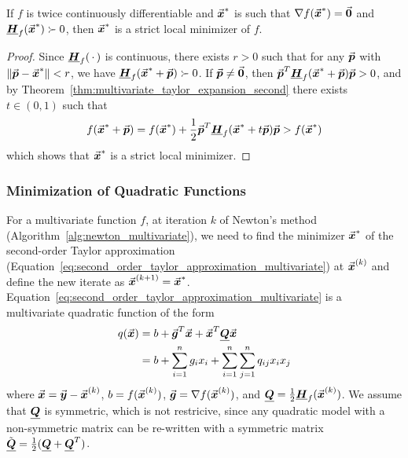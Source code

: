 \begin{theorem}\label{thm:sufficient_optimality_conditions_multivariate}
If \(f\) is twice continuously differentiable and \(\vec{\boldsymbol{x}}^{*}\) is such that \(\nabla f(\vec{\boldsymbol{x}}^{*})=\vec{\boldsymbol{0}}\) and \(\underline{\boldsymbol{H}}_{f}(\vec{\boldsymbol{x}}^{*})\succ 0\), then \(\vec{\boldsymbol{x}}^{*}\) is a strict local minimizer of \(f\).
\end{theorem}
\begin{proof}
Since \(\underline{\boldsymbol{H}}_{f}(\, \cdot \,)\) is continuous, there exists \(r>0\) such that for any \(\vec{\boldsymbol{p}}\) with \(\|\vec{\boldsymbol{p}} - \vec{\boldsymbol{x}}^{*}\| < r\), we have \(\underline{\boldsymbol{H}}_{f}(\vec{\boldsymbol{x}}^{*}+\vec{\boldsymbol{p}}) \succ 0\). 
If \(\vec{\boldsymbol{p}} \neq \vec{\boldsymbol{0}}\), then \(\vec{\boldsymbol{p}}^{T}\underline{\boldsymbol{H}}_{f}(\vec{\boldsymbol{x}}^{*}+\vec{\boldsymbol{p}})\vec{\boldsymbol{p}} > 0\), and by Theorem~\ref{thm:multivariate_taylor_expansion_second} there exists \(t \in (0,1)\) such that
\[
f(\vect{x}^{*}+\vect{p})=f(\vect{x}^{*})+\frac{1}{2}\vect{p}^{T}\matr{H}_{f}(\vect{x}^{*}+t\vect{p})\vect{p} > f(\vect{x}^{*}) %
\]
which shows that \(\vec{\boldsymbol{x}}^{*}\) is a strict local minimizer.
\end{proof}

\subsubsection{Minimization of Quadratic Functions}
\label{subsubsec:quadratic_minimization}
For a multivariate function \(f\), at iteration \(k\) of Newton's method (Algorithm~\ref{alg:newton_multivariate}), we need to find the minimizer \(\vec{\boldsymbol{x}}^{*}\) of the second-order Taylor approximation (Equation~\ref{eq:second_order_taylor_approximation_multivariate}) at \(\vec{\boldsymbol{x}}^{(k)}\) and define the new iterate as \(\vec{\boldsymbol{x}}^{(k+1)} = \vec{\boldsymbol{x}}^{*}\).
Equation~\ref{eq:second_order_taylor_approximation_multivariate} is a multivariate quadratic function of the form
\begin{align}
q(\vec{\boldsymbol{x}}) &= b + \vec{\boldsymbol{g}}^{T}\vec{\boldsymbol{x}} + \vec{\boldsymbol{x}}^{T}\underline{\boldsymbol{Q}}\vec{\boldsymbol{x}} \label{eq:multivariate_quadratic_function} \\
&= b + \sum_{i=1}^{n}g_{i}x_{i} + \sum_{i=1}^{n}\sum_{j=1}^{n}q_{ij}x_{i}x_{j} \label{eq:multivariate_quadratic_function_expanded}
\end{align}
where \(\vec{\boldsymbol{x}} = \vec{\boldsymbol{y}} - \vec{\boldsymbol{x}}^{(k)}\), \(b = f(\vec{\boldsymbol{x}}^{(k)})\), \(\vec{\boldsymbol{g}} = \nabla f(\vec{\boldsymbol{x}}^{(k)})\), and \(\underline{\boldsymbol{Q}} = \frac{1}{2}\underline{\boldsymbol{H}}_{f}(\vec{\boldsymbol{x}}^{(k)})\).
We assume that \(\underline{\boldsymbol{Q}}\) is symmetric, which is not restricive, since any quadratic model with a non-symmetric matrix can be re-written with a symmetric matrix \(\tilde{\underline{\boldsymbol{Q}}} = \frac{1}{2}(\underline{\boldsymbol{Q}}+\underline{\boldsymbol{Q}}^{T})\).

